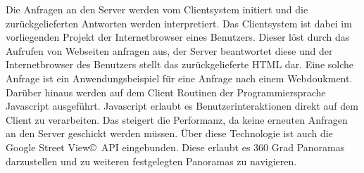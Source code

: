 Die Anfragen an den Server werden vom Clientsystem initiert und die zurückgelieferten Antworten werden interpretiert. Das Clientsystem ist dabei im vorliegenden Projekt der Internetbrowser eines Benutzers. Dieser löst durch das Aufrufen von Webseiten anfragen aus, der Server beantwortet diese und der Internetbrowser des Benutzers stellt das zurückgelieferte HTML dar. Eine solche Anfrage ist ein Anwendungsbeispiel für eine Anfrage nach einem Webdoukment. Darüber hinaus werden auf dem Client Routinen der Programmiersprache Javascript ausgeführt. Javascript erlaubt es Benutzerinteraktionen direkt auf dem Client zu verarbeiten. Das steigert die Performanz, da keine erneuten Anfragen an den Server geschickt werden müssen. Über diese Technologie ist auch die Google Street View\copyright\ API eingebunden. Diese erlaubt es 360 Grad Panoramas darzustellen und zu weiteren festgelegten Panoramas zu navigieren.